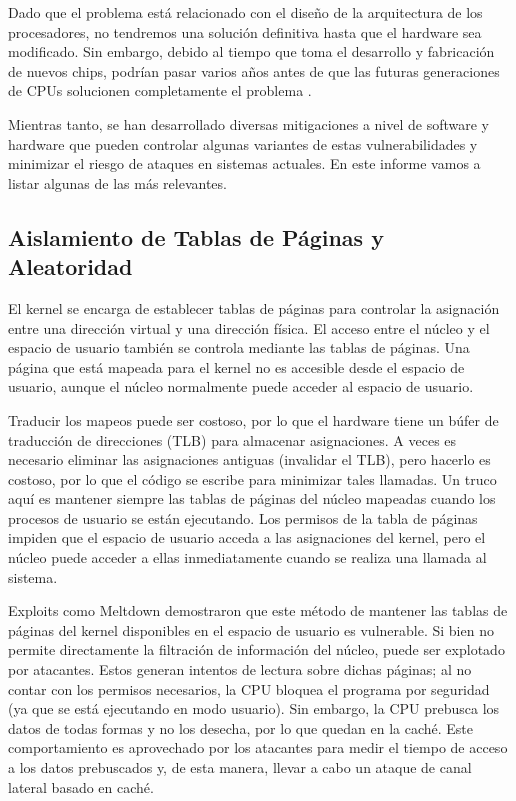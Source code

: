 \documentclass[lettersize,compsoc]{IEEEtran}
\begin{document}
Dado que el problema está relacionado con el diseño de la arquitectura de los procesadores, no tendremos una solución definitiva hasta que el hardware sea modificado. Sin embargo, debido al tiempo que toma el desarrollo y fabricación de nuevos chips, podrían pasar varios años antes de que las futuras generaciones de CPUs solucionen completamente el problema \cite{spectre} \cite{meltdown}.

Mientras tanto, se han desarrollado diversas mitigaciones a nivel de software y hardware que pueden controlar algunas variantes de estas vulnerabilidades y minimizar el riesgo de ataques en sistemas actuales. En este informe vamos a listar algunas de las más relevantes.

\subsection{Aislamiento de Tablas de Páginas y Aleatoridad} El kernel se encarga de establecer tablas de páginas para controlar la asignación entre una dirección virtual y una dirección física. El acceso entre el núcleo y el espacio de usuario también se controla mediante las tablas de páginas. Una página que está mapeada para el kernel no es accesible desde el espacio de usuario, aunque el núcleo normalmente puede acceder al espacio de usuario.

Traducir los mapeos puede ser costoso, por lo que el hardware tiene un búfer de traducción de direcciones (TLB) para almacenar asignaciones. A veces es necesario eliminar las asignaciones antiguas (invalidar el TLB), pero hacerlo es costoso, por lo que el código se escribe para minimizar tales llamadas. Un truco aquí es mantener siempre las tablas de páginas del núcleo mapeadas cuando los procesos de usuario se están ejecutando. Los permisos de la tabla de páginas impiden que el espacio de usuario acceda a las asignaciones del kernel, pero el núcleo puede acceder a ellas inmediatamente cuando se realiza una llamada al sistema.

Exploits como Meltdown demostraron que este método de mantener las tablas de páginas del kernel disponibles en el espacio de usuario es vulnerable. Si bien no permite directamente la filtración de información del núcleo, puede ser explotado por atacantes. Estos generan intentos de lectura sobre dichas páginas; al no contar con los permisos necesarios, la CPU bloquea el programa por seguridad (ya que se está ejecutando en modo usuario). Sin embargo, la CPU prebusca los datos de todas formas y no los desecha, por lo que quedan en la caché. Este comportamiento es aprovechado por los atacantes para medir el tiempo de acceso a los datos prebuscados y, de esta manera, llevar a cabo un ataque de canal lateral basado en caché.
\end{document}
